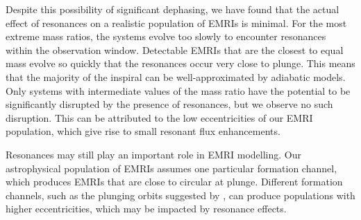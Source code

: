 Despite this possibility of significant dephasing, we have found that the actual effect of resonances on a realistic population of EMRIs is minimal. For the most extreme mass ratios, the systems evolve too slowly to encounter resonances within the observation window. Detectable EMRIs that are the closest to equal mass evolve so quickly that the resonances occur very close to plunge. This means that the majority of the inspiral can be well-approximated by adiabatic models. Only systems with intermediate values of the mass ratio have the potential to be significantly disrupted by the presence of resonances, but we observe no such disruption. This can be attributed to the low eccentricities of our EMRI population, which give rise to small resonant flux enhancements.

Resonances may still play an important role in EMRI modelling. Our astrophysical population of EMRIs assumes one particular formation channel, which produces EMRIs that are close to circular at plunge. Different formation channels, such as the plunging orbits suggested by \citet{amaro-seoane_role_2013}, can produce populations with higher eccentricities, which may be impacted by resonance effects.


